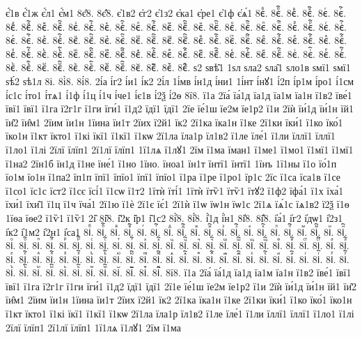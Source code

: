 {є҆́1в
є҆́1ж
є҆́л1
є҆́м1
8є҆̈8.
8є҆̑8.
є҆1в2
є҆г2
є҆1з2
є҆ка1
є҆ре1
є҆1ф
є҆ѧ́1
8єⷠ.
8єⷠ҇.
8єⷡ.
8єⷡ҇.
8єⷢ.
8єⷢ҇.
8єⷣ.
8єⷣ҇.
8єⷤ.
8єⷤ҇.
8єⷥ.
8єⷥ҇.
8єⷦ.
8єⷦ҇.
8єⷧ.
8єⷧ҇.
8єⷨ.
8єⷨ҇.
8єⷩ.
8єⷩ҇.
8єⷪ.
8єⷪ҇.
8єⷫ.
8єⷫ҇.
8єⷬ.
8єⷬ҇.
8єⷭ.
8єⷭ҇.
8єⷮ.
8єⷮ҇.
8єⷯ.
8єⷯ҇.
8єⷰ.
8єⷰ҇.
8єⷱ.
8єⷱ҇.
8єⷲ.
8єⷲ҇.
8єⷳ.
8єⷳ҇.
8єⷴ.
8єⷴ҇.
8єⷵ.
8єⷵ҇.
8єⷶ.
8єⷶ҇.
8єⷷ.
8єⷷ҇.
8єⷸ.
8єⷸ҇.
8єⷹ.
8єⷹ҇.
8єⷺ.
8єⷺ҇.
8єⷻ.
8єⷻ҇.
8єⷼ.
8єⷼ҇.
8єⷽ.
8єⷽ҇.
8єⷾ.
8єⷾ҇.
8єⷿ.
8єⷿ҇.
8єꙴ.
8єꙴ҇.
8єꙵ.
8єꙵ҇.
8єꙶ.
8єꙶ҇.
8єꙷ.
8єꙷ҇.
8єꙸ.
8єꙸ҇.
8єꙹ.
8єꙹ҇.
8єꙺ.
8єꙺ҇.
8єꙻ.
8єꙻ҇.
8є꙼.
8є꙼҇.
8є꙽.
8є꙽҇.
ѕ2
ѕвѣ̑1
1ѕл
ѕла2
ѕла̑1
ѕло1в
ѕмї1
ѕмї1
ѕѣ́2
ѕѣ1л
8і.
8і̀8.
8і́8.
2і́а
і́г2
і́и1
і́к2
2і́л
1і́мв
і́н1д
і́ни1
1і́нт
і́нꙋ1
і́2п
і́р1м
і́ро1
і́1см
і́с1с
і́то1
і́тѧ1
і́1ф
і́1ц
і́1ч
і́че1
і́є1в
і́2ѯ
і́2ѳ
8ї8.
ї1а
2їа́
їа́1д
їа1д
їа1м
їа1н
ї1в2
їве́1
ївї1
ївї1
ї1га
ї2г1г
ї1ги
їги́1
ї1д2
їдї1
їдї1
2їе
їе́1ш
їе2м
їе1р2
ї1и
2їѝ
їи́1д
їи́1н
їй1
їи̑2
їи̑м1
2їим
їи1н
1їина
їи1т
2їих
ї2й1
їк2
2ї1ка
їка1н
ї1ке
2ї1ки
їки́1
ї1ко
їко́1
їко1н
ї1кт
їкто1
ї1кі
їкї1
ї1кї1
ї1кѡ
2ї1ла
їла1р
їл1в2
ї1ле
їле́1
ї1ли
їллї1
їллї1
ї1ло1
ї1лі
2їлї
їлїп1
2ї1лї
їлїп1
1ї1лѧ
ї1лꙋ1
2їм
ї1ма
їман1
ї1ме1
ї1мо1
ї1мї1
ї1мї1
ї1на2
2їн1б
їн1д
ї1не
їне́1
ї1но
1їно.
їноа1
їн1т
їнтї1
їнтї1
1їнъ
1ї1ны
ї1о
їо́1п
їо1м
їо1н
ї1па2
їп1п
їпї1
їпїо1
їпї1
їпїо1
ї1ра
ї1ре
ї1ро1
їр1с
2їс
ї1са
їса1в
ї1се
ї1со1
їс1с
їст2
ї1сє
їсі́1
ї1сѡ
ї1т2
1їтѝ
їті́1
1їтѝ
їтѷ1
їтѷ1
їтꙋ2
ї1ф2
їфа́1
ї1х
їха́1
їхи́1
їхи̑1
ї1ц
ї1ч
їча́1
2ї1ю
ї1ѐ
2ї1є
їє́1
2ї1ѝ
ї1ѡ
їѡ1н
їѡ1с
2ї1ѧ
їѧ́1с
їѧ1в2
ї2ѯ
ї1ѳ
1їѳа
їѳе2
ї1ѷ1
ї1ѷ1
2і̑
8і̑8.
і̑2к
і̑р1
і̑1с2
8і҆̀8.
8і҆́8.
і҆́1д
і҆́н1
8і҆̈8.
8і҆̑8.
і҆а́1
і҆г2
і҆дѡ1
і҆2з1
і҆к2
і҆1м2
і҆2н1
і҆са1
8іⷠ.
8іⷠ҇.
8іⷡ.
8іⷡ҇.
8іⷢ.
8іⷢ҇.
8іⷣ.
8іⷣ҇.
8іⷤ.
8іⷤ҇.
8іⷥ.
8іⷥ҇.
8іⷦ.
8іⷦ҇.
8іⷧ.
8іⷧ҇.
8іⷨ.
8іⷨ҇.
8іⷩ.
8іⷩ҇.
8іⷪ.
8іⷪ҇.
8іⷫ.
8іⷫ҇.
8іⷬ.
8іⷬ҇.
8іⷭ.
8іⷭ҇.
8іⷮ.
8іⷮ҇.
8іⷯ.
8іⷯ҇.
8іⷰ.
8іⷰ҇.
8іⷱ.
8іⷱ҇.
8іⷲ.
8іⷲ҇.
8іⷳ.
8іⷳ҇.
8іⷴ.
8іⷴ҇.
8іⷵ.
8іⷵ҇.
8іⷶ.
8іⷶ҇.
8іⷷ.
8іⷷ҇.
8іⷸ.
8іⷸ҇.
8іⷹ.
8іⷹ҇.
8іⷺ.
8іⷺ҇.
8іⷻ.
8іⷻ҇.
8іⷼ.
8іⷼ҇.
8іⷽ.
8іⷽ҇.
8іⷾ.
8іⷾ҇.
8іⷿ.
8іⷿ҇.
8іꙴ.
8іꙴ҇.
8іꙵ.
8іꙵ҇.
8іꙶ.
8іꙶ҇.
8іꙷ.
8іꙷ҇.
8іꙸ.
8іꙸ҇.
8іꙹ.
8іꙹ҇.
8іꙺ.
8іꙺ҇.
8іꙻ.
8іꙻ҇.
8і꙼.
8і꙼҇.
8і꙽.
8і꙽҇.
8ї8.
ї1а
2їа́
їа́1д
їа1д
їа1м
їа1н
ї1в2
їве́1
ївї1
ївї1
ї1га
ї2г1г
ї1ги
їги́1
ї1д2
їдї1
їдї1
2ї1е
їе́1ш
їе2м
їе1р2
ї1и
2їѝ
їи́1д
їи́1н
їй1
їи̑2
їи̑м1
2їим
їи1н
1їина
їи1т
2їих
ї2й1
їк2
2ї1ка
їка1н
ї1ке
2ї1ки
їки́1
ї1ко
їко́1
їко1н
ї1кт
їкто1
ї1кі
їкї1
ї1кї1
ї1кѡ
2ї1ла
їла1р
їл1в2
ї1ле
їле́1
ї1ли
їллї1
їллї1
ї1ло1
ї1лі
2їлї
їлїп1
2ї1лї
їлїп1
1ї1лѧ
ї1лꙋ1
2їм
ї1ма
}
